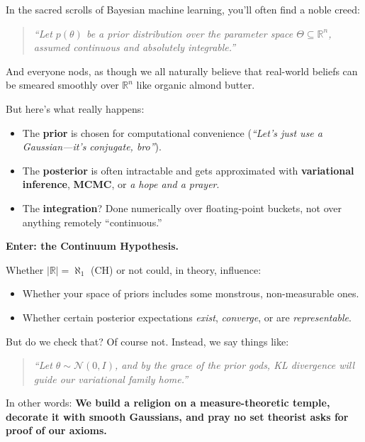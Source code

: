 \begin{tcolorbox}[title={\faBookmark\hspace{0.5em}Historical Sidebar: Bayesian Priors and the Convenient Lie of Continuity}, colback=gray!5, colframe=black, fonttitle=\bfseries]
  In the sacred scrolls of Bayesian machine learning, you’ll often find a noble creed:
  
  \begin{quote}
  \emph{“Let \(p(\theta)\) be a prior distribution over the parameter space \(\Theta \subseteq \mathbb{R}^n\), assumed continuous and absolutely integrable.”}
  \end{quote}
  
  And everyone nods, as though we all naturally believe that real-world beliefs can be smeared smoothly over \(\mathbb{R}^n\) like organic almond butter.

  \medskip
  
  But here’s what really happens:

  \medskip

  \begin{itemize}
    \item The \textbf{prior} is chosen for computational convenience (\emph{“Let's just use a Gaussian—it’s conjugate, bro”}).
    \item The \textbf{posterior} is often intractable and gets approximated with \textbf{variational inference}, \textbf{MCMC}, or \emph{a hope and a prayer}.
    \item The \textbf{integration}? Done numerically over floating-point buckets, not over anything remotely “continuous.”
  \end{itemize}

  \medskip
  
  \textbf{Enter: the Continuum Hypothesis.}

  \medskip
  
  Whether \(|\mathbb{R}| = \aleph_1\) (CH) or not could, in theory, influence:

  \medskip

  \begin{itemize}
    \item Whether your space of priors includes some monstrous, non-measurable ones.
    \item Whether certain posterior expectations \emph{exist}, \emph{converge}, or are \emph{representable}.
  \end{itemize}

  \medskip
  
  But do we check that? Of course not.  Instead, we say things like:

  \begin{quote}
  \emph{“Let \(\theta \sim \mathcal{N}(0, I)\), and by the grace of the prior gods, KL divergence will guide our variational family home.”}
  \end{quote}
  
  In other words: \textbf{We build a religion on a measure-theoretic temple, decorate it with smooth Gaussians, and pray no set theorist asks for proof of our axioms.}
\end{tcolorbox}









